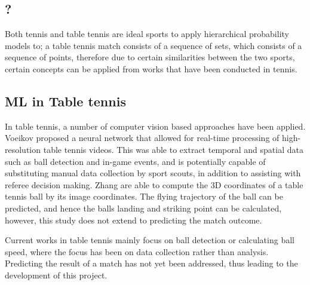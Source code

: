 \subsection{?}
Both tennis and table tennis are ideal sports to apply hierarchical probability models to; a table tennis match consists of a sequence of sets, which consists of a sequence of points, therefore due to certain similarities between the two sports, certain concepts can be applied from works that have been conducted in tennis.

\subsection{ML in Table tennis}
In table tennis, a number of computer vision based approaches have been applied. Voeikov \etal \cite{voeikov2020ttnet} proposed a neural network that allowed for real-time processing of high-resolution table tennis videos. This was able to extract temporal and spatial data such as ball detection and in-game events, and is potentially capable of substituting manual data collection by sport scouts, in addition to assisting with referee decision making. Zhang \etal \cite{zhang2010visual} are able to compute the 3D coordinates of a table tennis ball by its image coordinates. The flying trajectory of the ball can be predicted, and hence the balls landing and striking point can be calculated, however, this study does not extend to predicting the match outcome.

Current works in table tennis mainly focus on ball detection or calculating ball speed, where the focus has been on data collection rather than analysis. Predicting the result of a match has not yet been addressed, thus leading to the development of this project.


